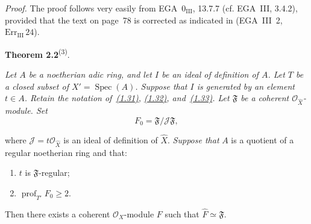 \documentclass[11pt,a4paper,oneside]{book}
\theoremstyle{plain}
\theoremstyle{definition}
\theoremstyle{remark}
\begin{document}
\medskip
\noindent\textit{Proof.}\quad
The proof follows very easily from EGA~$0_{\mathrm{III}}$, 13.7.7
(cf. EGA~III, 3.4.2), provided that the text on page~78 is corrected as
indicated in (EGA~III~2, $\mathrm{Err}_{\mathrm{III}}\,24$).

\medskip
{}\noindent\textbf{Theorem 2.2}\textsuperscript{(3)}.\quad
{\itshape Let $A$ be a noetherian adic ring, and let $I$ be an ideal of
definition of $A$. Let $T$ be a closed subset of
$X'=\operatorname{Spec}(A)$. Suppose that $I$ is generated by an element
$t\in A$. Retain the notation of~\hyperref[eq:IX.1.31]{(1.31)}, \hyperref[eq:IX.1.32]{(1.32)}, and~\hyperref[eq:IX.1.33]{(1.33)}. Let
$\mathfrak F$ be a coherent $\mathcal O_{\widehat X}$-module. Set
\begin{equation}
\tag{2.8}\label{eq:IX.2.8}
F_0=\mathfrak F/\mathcal J\mathfrak F,
\end{equation}
\par\smallskip
{}
\par\smallskip
where $\mathcal J=t\mathcal O_{\widehat X}$ is an ideal of definition of
$\widehat X$. \emph{Suppose that} $A$ is a quotient of a regular
noetherian ring and that:
\begin{enumerate}
\renewcommand{\labelenumi}{(\arabic{enumi})}
\setlength{\itemsep}{0.35em}
\item $t$ is $\mathfrak F$-regular;
\item $\operatorname{prof}_{T'}F_0\geq 2$.
\end{enumerate}
Then there exists a coherent $\mathcal O_X$-module $F$ such that
$\widehat F\simeq\mathfrak F$.}
\end{document}
